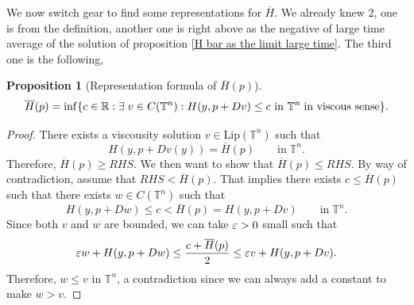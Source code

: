 \documentclass[12pt, oneside]{amsart}  	%
\newtheorem{proposition}{Proposition}
\begin{document}
We now switch gear to find some representations for $\overline{H}$. We already knew 2, one is from the definition, another one is right above as the negative of large time average of the solution of proposition \ref{H bar as the limit large time}. The third one is the following,
\begin{proposition}[Representation formula of $\overline{H}(p)$]
\begin{equation*}
\overline{H}(p)=\inf\{ c \in \mathbb{R}: \exists\;v\in C(\mathbb{T}^n): H(y, p+Dv)\le c \text{ in }\mathbb{T}^n\;\text{in viscous sense}\}.
\end{equation*}
\end{proposition}
\begin{proof} There exists a viscousity solution $v\in \text{Lip}(\mathbb{T}^n)$
such that
\begin{equation*}
H(y, p + Dv(y))=\overline{H}(p) \qquad\text{in}\; \mathbb{T}^n.
\end{equation*}
Therefore, $\overline{H}(p)\ge RHS$. We then want to show that $\overline{H}(p)\le RHS$. By way of contradiction, assume that $RHS<\overline{H}(p)$. That implies there exists $c\le \overline{H}(p)$ such that there exists $w\in C(\mathbb{T}^n)$ such that
\begin{equation*}
H(y, p+ Dw)\le c < \overline{H}(p)=H(y, p+ Dv) \qquad\text{in}\; \mathbb{T}^n.
\end{equation*}
Since both $v$ and $w$ are bounded, we can take $\varepsilon>0$ small such that
\begin{equation*}
\varepsilon w + H(y, p+ Dw)\le \frac{c+\overline{H}(p)}{2} \le \varepsilon v + H(y, p+ Dv).
\end{equation*}
Therefore, $w\le v$ in $\mathbb{T}^n$, a contradiction since we can always add a constant to make $w>v$.
\end{proof}
\end{document}

